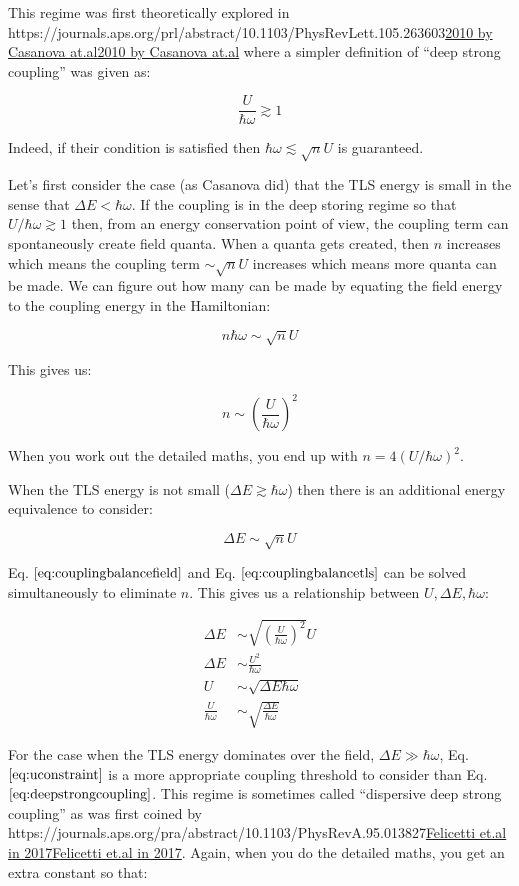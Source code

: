\documentclass[
]{article}
\let\oldhref\href
\renewcommand{\href}[2]{\ifx#1\urlprefix\oldhref{#1}{#2}\else\uline{\oldhref{#1}{#2}}\fi}
\renewcommand{\[}{\begin{equation}}
\renewcommand{\]}{\end{equation}}
\begin{document}
This regime was first theoretically explored in
\href{https://journals.aps.org/prl/abstract/10.1103/PhysRevLett.105.263603}{2010
by Casanova at.al} where a simpler definition of ``deep strong
coupling'' was given as:

\[
\frac{U}{\hbar\omega} \gtrsim 1
\label{eq:deepstrongcoupling}
\]

Indeed, if their condition is satisfied then
\(\hbar \omega \lesssim \sqrt{n}U\) is guaranteed.

Let's first consider the case (as Casanova did) that the TLS energy is
small in the sense that \(\Delta E < \hbar \omega\). If the coupling is
in the deep storing regime so that \(U/\hbar\omega \gtrsim 1\) then,
from an energy conservation point of view, the coupling term can
spontaneously create field quanta. When a quanta gets created, then
\(n\) increases which means the coupling term \(\sim \sqrt{n}U\)
increases which means more quanta can be made. We can figure out how
many can be made by equating the field energy to the coupling energy in
the Hamiltonian:

\[
n\hbar\omega \sim \sqrt{n}U
\label{eq:couplingbalancefield}
\]

This gives us:

\[
n \sim \left(\frac{U}{\hbar\omega}\right)^2
\label{eq:selfconsistentn}
\]

When you work out the detailed maths, you end up with
\(n = 4(U/\hbar\omega)^2\).

When the TLS energy is not small (\(\Delta E \gtrsim \hbar \omega\))
then there is an additional energy equivalence to consider:

\[
\Delta E \sim \sqrt{n}U
\label{eq:couplingbalancetls}
\]

Eq. \(\ref{eq:couplingbalancefield}\) and Eq.
\(\ref{eq:couplingbalancetls}\) can be solved simultaneously to
eliminate \(n\). This gives us a relationship between
\(U,\Delta E,\hbar\omega\):

\[
\begin{aligned}
\Delta E &\sim \sqrt{\left(\frac{U}{\hbar\omega}\right)^2}U \\
\Delta E &\sim \frac{U^2}{\hbar\omega} \\
U &\sim \sqrt{\Delta E \hbar\omega} \\
\frac{U}{\hbar\omega} &\sim \sqrt{\frac{\Delta E}{\hbar\omega}}
\end{aligned}
\label{eq:uconstraint}
\]

For the case when the TLS energy dominates over the field,
\(\Delta E \gg \hbar \omega\), Eq. \(\ref{eq:uconstraint}\) is a more
appropriate coupling threshold to consider than Eq.
\(\ref{eq:deepstrongcoupling}\). This regime is sometimes called
``dispersive deep strong coupling'' as was first coined by
\href{https://journals.aps.org/pra/abstract/10.1103/PhysRevA.95.013827}{Felicetti
et.al in 2017}. Again, when you do the detailed maths, you get an extra
constant so that:
\end{document}
